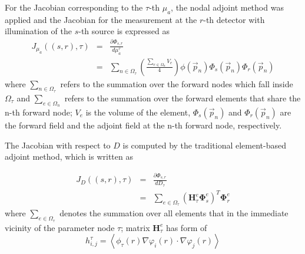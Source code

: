 \documentclass{article}
\begin{document}
For the Jacobian corresponding to the $\tau$-th $\mu_a$, the nodal
adjoint method was applied and the Jacobian for the measurement at
the $r$-th detector with illumination of the $s$-th source is
expressed as
\begin{eqnarray}\nonumber
J_{\mu_a}((s,r),\tau)&=&\frac{\partial
\Phi_{s,r}}{d\mu_a^{\tau}}\\&=&\sum_{n\in\Omega_\tau}\left(\frac{\sum_{e\in\Omega_n}
V_e}{4}\right)\phi(\vec{p}_n)\Phi_s(\vec{p}_n)\Phi_r(\vec{p}_n)
\end{eqnarray}
where $\sum_{n\in\Omega_\tau}$ refers to the summation over the
forward nodes which fall inside $\Omega_\tau$ and
$\sum_{e\in\Omega_n}$ refers to the summation over the forward
elements that share the n-th forward node; $V_e$ is the volume of
the element, $\Phi_s(\vec{p}_n)$ and $\Phi_r(\vec{p}_n)$ are the
forward field and the adjoint field at the n-th forward node,
respectively.

The Jacobian with respect to $D$ is computed by the traditional
element-based adjoint method, which is written as

\begin{eqnarray}\nonumber
J_{D}((s,r),\tau)&=&\frac{\partial
\Phi_{s,r}}{dD_{\tau}}\\&=&\sum_{e\in\Omega_\tau}\left(\mathbf{H}_\tau^e{\boldsymbol\Phi}_s^e\right)^T{\boldsymbol\Phi}_r^e
\end{eqnarray}
where $\sum_{e\in\Omega_\tau}$ denotes the summation over all
elements that in the immediate vicinity of the parameter node $\tau$;
matrix $\mathbf{H}_\tau^e$ has form of
\begin{equation}
h^\tau_{i,j}=\left\langle
\phi_\tau(r)\nabla\varphi_i(r)\cdot\nabla\varphi_j(r)\right\rangle
\end{equation}
\end{document}
